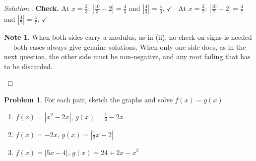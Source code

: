 \documentclass[11pt,a4paper]{article}
\theoremstyle{definition}
\newtheorem{note}[thm]{Note}
\newtheorem{problemx}{Problem}[section]
\newenvironment{problem}{\begin{problemx}}{\end{problemx}}
\newenvironment{solution}
  {\renewcommand{\qedsymbol}{}\begin{proof}[\textit{Solution}.]}
  {\end{proof}}
\let\amscheckmark\checkmark
\renewcommand{\checkmark}{\ensuremath{\amscheckmark}}
\begin{document}
\begin{solution}
\textbf{Check.} At $x=\frac{2}{3}$: $\left|\frac{10}{3}-2\right|=\frac{4}{3}$ and
$\left|\frac{4}{3}\right|=\frac{4}{3}$. $\checkmark$ \ At $x=\frac{2}{7}$:
$\left|\frac{10}{7}-2\right|=\frac{4}{7}$ and $\left|\frac{4}{7}\right|=\frac{4}{7}$.
$\checkmark$

\begin{note}
When both sides carry a modulus, as in (ii), no check on signs is needed --- both cases
always give genuine solutions. When only one side does, as in the next question, the
other side must be non-negative, and any root failing that has to be discarded.
\end{note}
\end{solution}

\begin{problem}
For each pair, sketch the graphs and solve $f(x)=g(x)$.
\begin{enumerate}
\item[(i).] $f(x)=\left|x^2-2x\right|$, \quad $g(x)=\frac{1}{4}-2x$
\item[(ii).] $f(x)=-2x$, \quad $g(x)=\left|\frac{1}{2}x-2\right|$
\item[(iii).] $f(x)=|5x-4|$, \quad $g(x)=24+2x-x^2$
\end{enumerate}
\end{problem}
\end{document}
